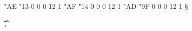 

\setcharcode  "AE  "13    0    0     0  12  1  \texmacro \flqq
\setcharcode  "AF  "14    0    0     0  12  1  \texmacro \frqq
\setcharcode  "AD  "9F    0    0     0  12  1  \texmacro \S

\redefaccent \'
\redefaccent \v 
\redefaccent \" 
\redefaccent \.
\redefaccent \c 
\redefaccent \^ 
\redefaccent \r 
\redefaccent \H
\redefaccent \og

